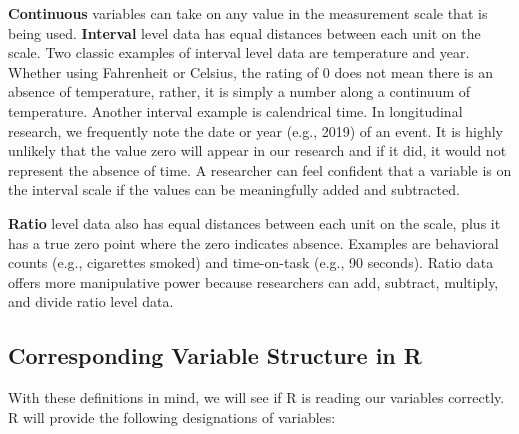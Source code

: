 \documentclass[
  11pt,
]{book}
\begin{document}
\textbf{Continuous} variables can take on any value in the measurement scale that is being used. \textbf{Interval} level data has equal distances between each unit on the scale. Two classic examples of interval level data are temperature and year. Whether using Fahrenheit or Celsius, the rating of 0 does not mean there is an absence of temperature, rather, it is simply a number along a continuum of temperature. Another interval example is calendrical time. In longitudinal research, we frequently note the date or year (e.g., 2019) of an event. It is highly unlikely that the value zero will appear in our research and if it did, it would not represent the absence of time. A researcher can feel confident that a variable is on the interval scale if the values can be meaningfully added and subtracted.

\textbf{Ratio} level data also has equal distances between each unit on the scale, plus it has a true zero point where the zero indicates absence. Examples are behavioral counts (e.g., cigarettes smoked) and time-on-task (e.g., 90 seconds). Ratio data offers more manipulative power because researchers can add, subtract, multiply, and divide ratio level data.

\hypertarget{corresponding-variable-structure-in-r}{%
\subsection{Corresponding Variable Structure in R}\label{corresponding-variable-structure-in-r}}

With these definitions in mind, we will see if R is reading our variables correctly. R will provide the following designations of variables:
\end{document}
